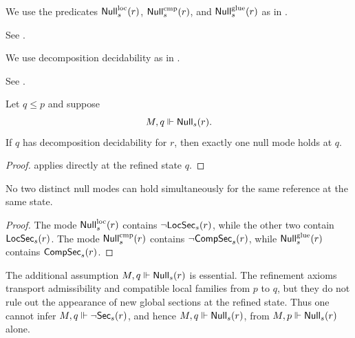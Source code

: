 \begin{definition}\label{def:null-failure-modes}
We use the predicates $\mathsf{Null}^{\mathrm{loc}}_s(r)$, $\mathsf{Null}^{\mathrm{cmp}}_s(r)$, and $\mathsf{Null}^{\mathrm{glue}}_s(r)$ as in \cite[Definition~4.26]{MaZhang2026ConditionalGluingFailure}.
\end{definition}

\begin{proposition}\label{prop:null-modes-imply-null}
See \cite[Proposition~4.27]{MaZhang2026ConditionalGluingFailure}.
\end{proposition}

\begin{definition}\label{def:decomposition-decidability}
We use decomposition decidability as in \cite[Definition~4.29]{MaZhang2026ConditionalGluingFailure}.
\end{definition}

\begin{proposition}\label{prop:null-trichotomy}
See \cite[Proposition~4.30]{MaZhang2026ConditionalGluingFailure}.
\end{proposition}

\begin{proposition}\label{thm:null-classification-under-refinement}
Let $q\le p$ and suppose
\[
M,q\Vdash \mathsf{Null}_s(r).
\]
If $q$ has decomposition decidability for $r$, then exactly one null mode holds at $q$.
\end{proposition}

\begin{proof}
 applies directly at the refined state $q$.
\end{proof}
\begin{proposition}\label{prop:null-modes-exclusive}
No two distinct null modes can hold simultaneously for the same reference at the same state.
\end{proposition}

\begin{proof}
The mode $\mathsf{Null}^{\mathrm{loc}}_s(r)$ contains $\neg\mathsf{LocSec}_s(r)$, while the other two contain $\mathsf{LocSec}_s(r)$. The mode $\mathsf{Null}^{\mathrm{cmp}}_s(r)$ contains $\neg\mathsf{CompSec}_s(r)$, while $\mathsf{Null}^{\mathrm{glue}}_s(r)$ contains $\mathsf{CompSec}_s(r)$.
\end{proof}

\begin{remark}\label{rem:null-nonpersistence}
The additional assumption $M,q\Vdash \mathsf{Null}_s(r)$ is essential. The refinement axioms transport admissibility and compatible local families from $p$ to $q$, but they do not rule out the appearance of new global sections at the refined state. Thus one cannot infer $M,q\Vdash \neg\mathsf{Sec}_s(r)$, and hence $M,q\Vdash \mathsf{Null}_s(r)$, from $M,p\Vdash \mathsf{Null}_s(r)$ alone.
\end{remark}

